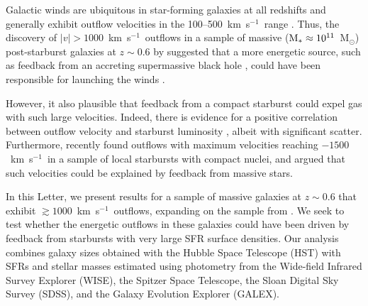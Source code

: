 \documentclass[apj]{emulateapj}
\newcommand{\kms}{km~s$^{-1}$}
\newcommand{\msun}{M$_{\odot}$}
\newcommand{\mstar}{M$_{*}$}
\begin{document}
Galactic winds are ubiquitous in star-forming galaxies at all
redshifts and generally exhibit outflow velocities in the
100--500~\kms\ range
\citep[e.g.,][]{hec00,sha03,mar05,rup05,wei09,rub10,ste10}.  Thus, the
discovery of $|v|>1000$~\kms\ outflows in a sample of massive
($\textnormal{\mstar}\approx10^{11}$~\msun) post-starburst galaxies at
$z\sim0.6$ by \citet{tre07} suggested that a more energetic source,
such as feedback from an accreting supermassive black hole
\citep[e.g.,][]{sil98,dim05}, could have been responsible for
launching the winds \citep[see][for a recent review]{fab12}.

However, it also plausible that feedback from a compact starburst
could expel gas with such large velocities.  Indeed, there is evidence
for a positive correlation between outflow velocity and starburst
luminosity \citep[e.g.,][]{mar05,rup05,tre07}, albeit with significant
scatter.  Furthermore, \citet{hec11} recently found outflows with
maximum velocities reaching $-1500$~\kms\ in a sample of local
starbursts with compact nuclei, and argued that such velocities could
be explained by feedback from massive stars.


In this Letter, we present results for a sample of massive galaxies at
$z\sim0.6$ that exhibit $\gtrsim1000$~\kms\ outflows, expanding on the
sample from \citet{tre07}.  We seek to test whether the energetic
outflows in these galaxies could have been driven by feedback from
starbursts with very large SFR surface densities.  Our analysis
combines galaxy sizes obtained with the Hubble Space Telescope (HST)
with SFRs and stellar masses estimated using photometry from the
Wide-field Infrared Survey Explorer (WISE), the Spitzer Space
Telescope, the Sloan Digital Sky Survey (SDSS), and the Galaxy
Evolution Explorer (GALEX).
\end{document}
